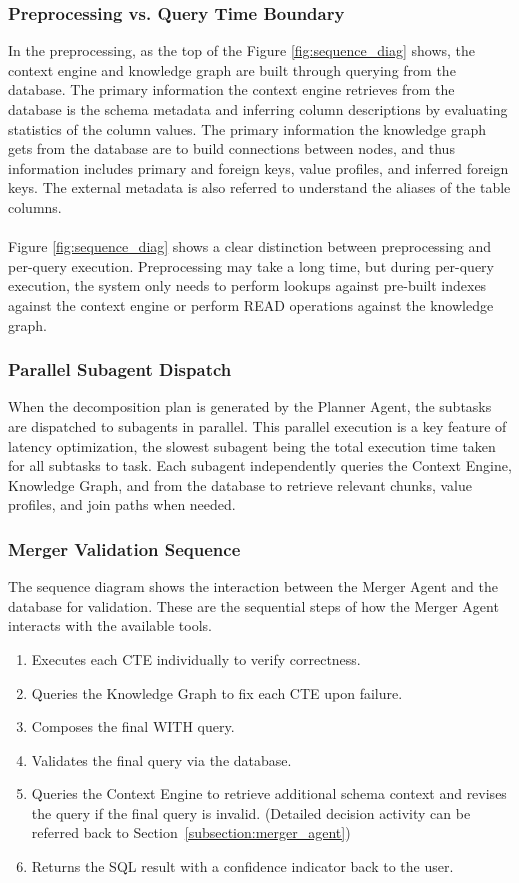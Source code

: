 \subsubsection{Preprocessing vs. Query Time Boundary}
In the preprocessing, as the top of the Figure \ref{fig:sequence_diag} shows, the context engine and knowledge graph are built through querying from the database. The primary information the context engine retrieves from the database is the schema metadata and inferring column descriptions by evaluating statistics of the column values. The primary information the knowledge graph gets from the database are to build connections between nodes, and thus information includes primary and foreign keys, value profiles, and inferred foreign keys. The external metadata is also referred to understand the aliases of the table columns.
\\\\
Figure \ref{fig:sequence_diag} shows a clear distinction between preprocessing and per-query execution. Preprocessing may take a long time, but during per-query execution, the system only needs to perform lookups against pre-built indexes against the context engine or perform READ operations against the knowledge graph.
\subsubsection{Parallel Subagent Dispatch}
When the decomposition plan is generated by the Planner Agent, the subtasks are dispatched to subagents in parallel. This parallel execution is a key feature of latency optimization, the slowest subagent being the total execution time taken for all subtasks to task. Each subagent independently queries the Context Engine, Knowledge Graph, and from the database to retrieve relevant chunks, value profiles, and join paths when needed. 
\subsubsection{Merger Validation Sequence}
The sequence diagram shows the interaction between the Merger Agent and the database for validation. These are the sequential steps of how the Merger Agent interacts with the available tools.
\begin{enumerate}
    \item Executes each CTE individually to verify correctness.
    \item Queries the Knowledge Graph to fix each CTE upon failure.
    \item Composes the final WITH query.
    \item Validates the final query via the database. 
    \item Queries the Context Engine to retrieve additional schema context and revises the query if the final query is invalid. (Detailed decision activity can be referred back to Section~\ref{subsection:merger_agent})
    \item Returns the SQL result with a confidence indicator back to the user.
\end{enumerate}

